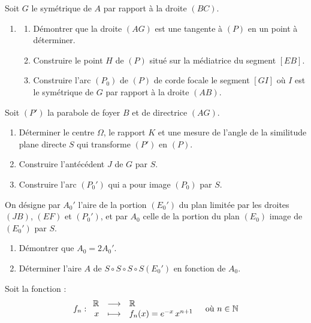 \documentclass[11pt]{article}
\begin{document}
Soit $G$ le symétrique de $A$ par rapport à la droite $(BC)$.

\begin{enumerate}[start=3]
  \item \begin{enumerate}[label=\alph*.]
    \item Démontrer que la droite $(AG)$ est une tangente à $(P)$ en un point à déterminer.
    \item Construire le point $H$ de $(P)$ situé sur la médiatrice du segment $[EB]$.
    \item Construire l'arc $(P_0)$ de $(P)$ de corde focale le segment $[GI]$ où $I$ est le symétrique de $G$ par rapport à la droite $(AB)$.
  \end{enumerate}
\end{enumerate}

Soit $(P')$ la parabole de foyer $B$ et de directrice $(AG)$.

\begin{enumerate}[start=4]
  \item Déterminer le centre $\Omega$, le rapport $K$ et une mesure de l'angle de la similitude plane directe $S$ qui transforme $(P')$ en $(P)$.
  \item Construire l'antécédent $J$ de $G$ par $S$.
  \item Construire l'arc $(P_0')$ qui a pour image $(P_0)$ par $S$.
\end{enumerate}

On désigne par $A_0'$ l'aire de la portion $(E_0')$ du plan limitée par les droites $(JB)$, $(EF)$ et $(P_0')$, et par $A_0$ celle de la portion du plan $(E_0)$ image de $(E_0')$ par $S$.

\begin{enumerate}[start=7]
  \item Démontrer que $A_0 = 2A_0'$.
  \item Déterminer l'aire $A$ de $S \circ S \circ S \circ S(E_0')$ en fonction de $A_0$.
\end{enumerate}


Soit la fonction :
\[ f_n : \begin{array}{rcl} \mathbb{R} & \longrightarrow & \mathbb{R} \\ x & \longmapsto & f_n(x) = e^{-x}\,x^{n+1} \end{array} \quad \text{où } n \in \mathbb{N} \]
\end{document}
